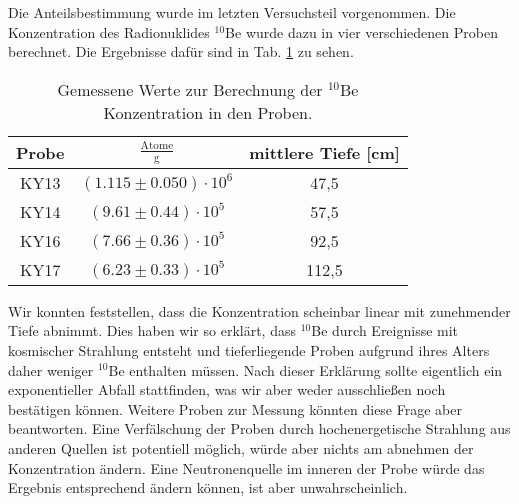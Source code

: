 Die Anteilsbestimmung wurde im letzten Versuchsteil vorgenommen.
Die Konzentration des Radionuklides $^{10}$Be wurde dazu in vier verschiedenen Proben berechnet.
Die Ergebnisse dafür sind in Tab. \ref{dis_con} zu sehen.
\begin{table}[h]
\centering
\caption{Gemessene Werte zur Berechnung der $^{10}$Be Konzentration in den Proben.}
\begin{tabular}{|c |c| c|}
\hline
Probe& $\frac{\text{Atome}}{\si{\gram}}$ & mittlere Tiefe [cm] \\
\hline
KY13 &  $(\num{1.115} \pm \num{0.050}) \cdot 10^{6} $ & 47,5\\
KY14 &  $(\num{9.61} \pm \num{0.44}) \cdot 10^{5} $ & 57,5 \\
KY16 &  $(\num{7.66} \pm \num{0.36}) \cdot 10^{5} $ & 92,5\\
KY17 &  $(\num{6.23} \pm \num{0.33}) \cdot 10^{5} $ & 112,5\\
\hline
\end{tabular}
\label{dis_con}
\end{table}
Wir konnten feststellen, dass die Konzentration scheinbar linear mit zunehmender Tiefe abnimmt.
Dies haben wir so erklärt, dass $^{10}$Be durch Ereignisse mit kosmischer Strahlung entsteht und tieferliegende Proben aufgrund ihres Alters daher weniger $^{10}$Be enthalten müssen.
Nach dieser Erklärung sollte eigentlich ein exponentieller Abfall stattfinden, was wir aber weder ausschließen noch bestätigen können.
Weitere Proben zur Messung könnten diese Frage aber beantworten.
Eine Verfälschung der Proben durch hochenergetische Strahlung aus anderen Quellen ist potentiell möglich, würde aber nichts am abnehmen der Konzentration ändern.
Eine Neutronenquelle im inneren der Probe würde das Ergebnis entsprechend ändern können, ist aber unwahrscheinlich.
